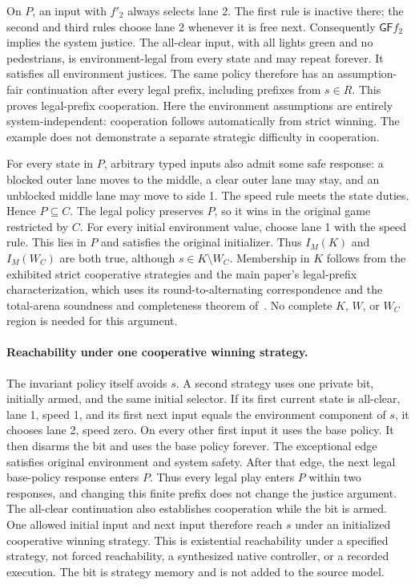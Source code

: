 On $P$, an input with $f'_2$ always selects lane 2. The first rule is
inactive there; the second and third rules choose lane 2 whenever it
is free next. Consequently $\mathsf{GF}f_2$ implies the system justice.
The all-clear input, with all lights green and no pedestrians, is
environment-legal from every state and may repeat forever. It satisfies
all environment justices. The same policy therefore has an
assumption-fair continuation after every legal prefix, including
prefixes from $s\in R$. This proves legal-prefix cooperation.
Here the environment assumptions are entirely system-independent:
cooperation follows automatically from strict winning. The example
does not demonstrate a separate strategic difficulty in cooperation.

For every state in $P$, arbitrary typed inputs also admit some safe
response: a blocked outer lane moves to the middle, a clear outer lane
may stay, and an unblocked middle lane may move to side 1. The speed
rule meets the state duties. Hence $P\subseteq C$. The legal policy
preserves $P$, so it wins in the original game restricted by $C$.
For every initial environment value, choose lane 1 with the speed
rule. This lies in $P$ and satisfies the original initializer.
Thus $I_M(K)$ and $I_M(W_C)$ are both true, although
$s\in K\setminus W_C$. Membership in $K$ follows from the exhibited
strict cooperative strategies and the main paper's legal-prefix
characterization, which uses its round-to-alternating correspondence
and the total-arena soundness and completeness theorem of~\cite{friendly}.
No complete $K$, $W$, or $W_C$ region is needed for this argument.

\paragraph{Reachability under one cooperative winning strategy.}
The invariant policy itself avoids $s$. A second strategy uses one
private bit, initially armed, and the same initial selector. If its
first current state is all-clear, lane 1, speed 1, and its first next
input equals the environment component of $s$, it chooses lane 2,
speed zero. On every other first input it uses the base policy.
It then disarms the bit and uses the base policy forever.
The exceptional edge satisfies original environment and system safety.
After that edge, the next legal base-policy response enters $P$.
Thus every legal play enters $P$ within two responses, and changing
this finite prefix does not change the justice argument. The all-clear
continuation also establishes cooperation while the bit is armed.
One allowed initial input and next input therefore reach $s$ under
an initialized cooperative winning strategy. This is existential
reachability under a specified strategy, not forced reachability,
a synthesized native controller, or a recorded execution. The bit is
strategy memory and is not added to the source model.

